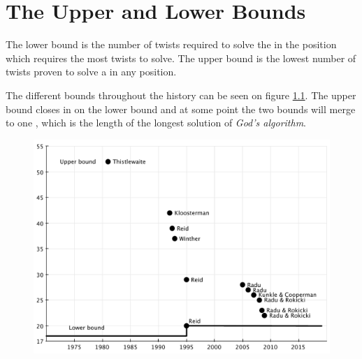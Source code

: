 \chapter{The Upper and Lower Bounds}
\label{chap:bounds}
The lower bound is the number of twists required to solve the \rubik{} in the position which requires the most twists to solve.
The upper bound is the lowest number of twists proven to solve a \rubik{} in any position.

The different bounds throughout the history can be seen on figure \ref{fig:upperLowerBound}.
The upper bound closes in on the lower bound and at some point the two bounds will merge to one \cite{rokicki09}, which is the length of the longest solution of \textit{God's algorithm}.

\begin{figure}[ht]
	\centering
		\includegraphics[scale = 0.5]{input/pics/bounds2.pdf}
	\caption{}
	\label{fig:upperLowerBound}
\end{figure}


\label{sec:bounds}
\pagebreak


